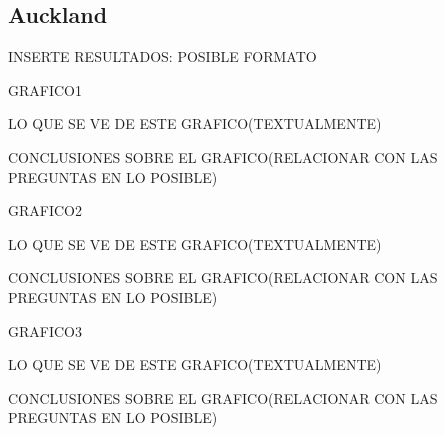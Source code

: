 \subsection{Auckland}

INSERTE RESULTADOS: POSIBLE FORMATO

GRAFICO1

LO QUE SE VE DE ESTE GRAFICO(TEXTUALMENTE)

CONCLUSIONES SOBRE EL GRAFICO(RELACIONAR CON LAS PREGUNTAS EN LO POSIBLE)


GRAFICO2

LO QUE SE VE DE ESTE GRAFICO(TEXTUALMENTE)

CONCLUSIONES SOBRE EL GRAFICO(RELACIONAR CON LAS PREGUNTAS EN LO POSIBLE)


GRAFICO3

LO QUE SE VE DE ESTE GRAFICO(TEXTUALMENTE)

CONCLUSIONES SOBRE EL GRAFICO(RELACIONAR CON LAS PREGUNTAS EN LO POSIBLE)
